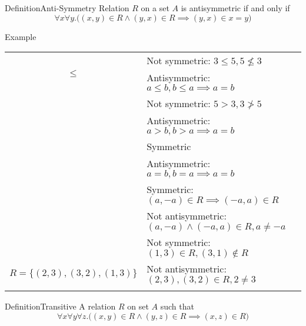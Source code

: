 \documentclass{MathNotes}
\newenvironment{example}[1]{\begin{BlueBox}{Example}{#1}}{\end{BlueBox}}
\newenvironment{definition}[1]{\begin{RedBox}{Definition}{#1}}{\end{RedBox}}
\begin{document}
\begin{definition}{Anti-Symmetry}
	Relation $R$ on a set $A$ is antisymmetric if and only if
	\[\forall x\forall y.\big((x,y)\in R\land(y,x)\in R\implies(y,x)\in x=y)\]
\end{definition}
\begin{example}{}
	\centering
	\begin{tabular}{cl}
		\multirow{2}{*}{$\leq$}                                                                      & Not symmetric: $3\leq5,5\not\leq3$                   \\
		                                                                                             & Antisymmetric: $a\leq b,b\leq a\implies a=b$         \\
		\hdashline
		\multirow{2}{*}{$>$}                                                                         & Not symmetric: $5>3,3\not>5$                         \\
		                                                                                             & Antisymmetric: $a>b,b>a\implies a=b$                 \\
		\hdashline
		\multirow{2}{*}{$=$}                                                                         & Symmetric                                            \\
		                                                                                             & Antisymmetric: $a=b,b=a\implies a=b$                 \\
		\hdashline
		\multirow{2}{*}{$R=\{(a,b)|a,b\in\mathbb{Z}\land a=-b\}\subseteq\mathbb{Z}\times\mathbb{Z}$} & Symmetric: $(a,-a)\in R\implies (-a,a)\in R$         \\
		                                                                                             & Not antisymmetric: $(a,-a)\land(-a,a)\in R,a\neq -a$ \\
		\hdashline
		\multirow{2}{*}{Let $A=\{1,2,3\}$}                                                           & Not symmetric: $(1,3)\in R,(3,1)\notin R$            \\
		$R=\{(2,3),(3,2),(1,3)\}$                                                                    & Not antisymmetric: $(2,3),(3,2)\in R,2\neq 3$        \\
		\hdashline
	\end{tabular}
\end{example}

\begin{definition}{Transitive}
	A relation $R$ on set $A$ such that
	\[\forall x\forall y\forall z.\big((x,y)\in R\land(y,z)\in R\implies(x,z)\in R\big)\]
\end{definition}
\end{document}

